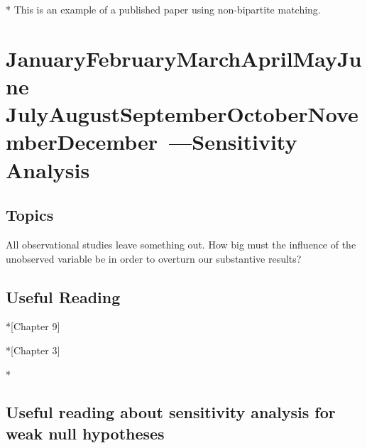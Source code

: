 \documentclass[10pt]{article}
\def\themonth{\ifcase\month\or
        January\or February\or March\or April\or May\or June\or
    July\or August\or September\or October\or November\or December\fi}
\begin{document}
    * This is an example of a published paper using non-bipartite matching.





    \AdvanceDate[7]
    \section{\themonth~\the\day---Sensitivity Analysis}

    \subsection{Topics} All observational studies leave something out. How big
    must the influence of the unobserved variable be in order to overturn our
    substantive results?

    \subsection{Useful Reading}

    *[Chapter 9]

    *[Chapter 3]

    *









    \subsection{Useful reading about sensitivity analysis for weak null hypotheses}




\end{document}
